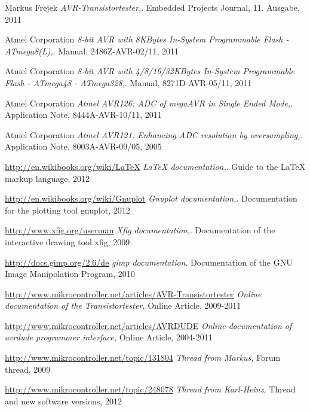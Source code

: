 \documentclass[12pt,a4paper,oneside,english]{report}
\begin{document}
\begin{thebibliography}{99}

Markus Frejek
\emph{AVR-Transistortester,}.
Embedded Projects Journal,
11. Ausgabe,
2011

Atmel Corporation
\emph{8-bit AVR with 8KBytes In-System Programmable Flash - ATmega8(L),}.
Manual,
2486Z-AVR-02/11,
2011

Atmel Corporation
\emph{8-bit AVR with 4/8/16/32KBytes In-System Programmable Flash - ATmega48 - ATmega328,}.
Manual,
8271D-AVR-05/11,
2011

Atmel Corporation
\emph{Atmel AVR126: ADC of megaAVR in Single Ended Mode,}.
Application Note,
8444A-AVR-10/11,
2011

Atmel Corporation
\emph{Atmel AVR121: Enhancing ADC resolution by oversampling,}.
Application Note,
8003A-AVR-09/05,
2005

\url{http://en.wikibooks.org/wiki/LaTeX}
\emph{LaTeX documentation,}.
Guide to the LaTeX markup language,
2012

\url{http://en.wikibooks.org/wiki/Gnuplot}
\emph{Gnuplot documentation,}.
Documentation for the plotting tool gnuplot,
2012

\url{http://www.xfig.org/userman}
\emph{Xfig documentation,}.
Documentation of the interactive drawing tool xfig,
2009

\url{http://docs.gimp.org/2.6/de}
\emph{gimp documentation}.
Documentation of the GNU Image Manipolation Program,
2010

\url{http://www.mikrocontroller.net/articles/AVR-Transistortester}
\emph{Online documentation of the Transistortester,}
Online Article,
2009-2011

\url{http://www.mikrocontroller.net/articles/AVRDUDE}
\emph{Online documentation of avrdude programmer interface,}
Online Article,
2004-2011

\url{http://www.mikrocontroller.net/topic/131804}
\emph{Thread from Markus,}
Forum thread, 
2009

\url{http://www.mikrocontroller.net/topic/248078}
\emph{Thread from Karl-Heinz,}
Thread and new software versions,
2012


\end{thebibliography}
\end{document}
